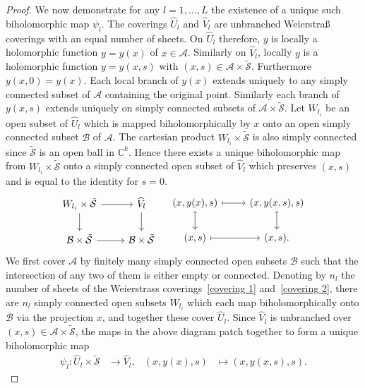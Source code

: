 \documentclass[11pt,twoside]{amsart}
\theoremstyle{plain}
\newcommand{\Am}{\mathcal{A}}
\newcommand{\Sm}{\mathcal{S}}
\begin{document}
\begin{proof}
We now demonstrate for any $l=1,\ldots,L$ the existence of a unique such biholomorphic map $\psi_l$. The coverings $\widehat{U}_l$ and $\widehat{V}_l$ are unbranched Weierstra{\ss} coverings with an equal number of sheets. On $\widehat{U}_l$ therefore, $y $ is locally a holomorphic function $y=y(x) $ of $x\in\Am$. Similarly on $\widehat{V}_l$, locally $ y $ is a holomorphic function $ y = y (x, s) $ with $(x,s)\in\Am\times\tilde{\Sm}$. Furthermore $ y (x, 0) = y (x) $. Each local branch of $y (x) $ extends uniquely to any simply connected subset of $\mathcal A $ containing the original point. Similarly each branch of $ y (x, s) $ extends uniquely on simply connected subsets of $\Am\times\tilde{\Sm}$. Let $W_{l_i} $ be an open subset of $\widehat{U}_l$ which is mapped biholomorphically by $x$ onto an open simply connected subset $\mathcal{B}$ of $\Am$. The cartesian product $W_{l_i}\times\tilde{\Sm}$ is also simply connected since $\tilde{\Sm}$ is an open ball in $\mathbb{C}^k$. Hence there exists a unique biholomorphic map from $W_{l_i}\times\tilde{\Sm}$ onto a simply connected open subset of $\widehat V_l$ which preserves $(x,s)$ and is equal to the identity for $s=0$. 
\[\begin{tikzcd}
W_{l_i}\times\tilde{\Sm} \arrow{r} \arrow[swap]{d}{} &  \widehat{V}_l\arrow{d} \\ \mathcal{B}\times\tilde{\Sm}  \arrow{r} & \mathcal{B}\times \tilde{\Sm}
\end{tikzcd} \quad
\begin{tikzcd}
(x,y (x), s)\rar[maps to]\dar[maps to] & (x, y (x, s), s)\dar[maps to]\\
(x, s)\rar[maps to] & (x, s).
\end{tikzcd}\]
We first cover $\Am$ by finitely many simply connected open subsets $\mathcal{B}$ such that the intersection of any two of them is either empty or connected. Denoting by $ n_l $ the number of sheets of the Weierstrass coverings~\eqref{covering 1} and~\eqref{covering 2}, there are $n_l $ simply connected open subsets $ W_{l_i} $ which each map biholomorphically onto $\mathcal{B} $ via the projection $ x $, and together these cover $\widehat{U}_l$. Since $ \widehat V_l$ is unbranched over $(x,s)\in\Am\times\tilde{\Sm}$, the maps in the above diagram patch together to form a unique biholomorphic map
\begin {align*}
\psi_l:   \widehat U_l\times\tilde{\Sm} &\to  \widehat V_l,& (x, y (x), s) & \mapsto (x, y (x, s), s).
\end {align*}

\end{proof}
\end{document}
